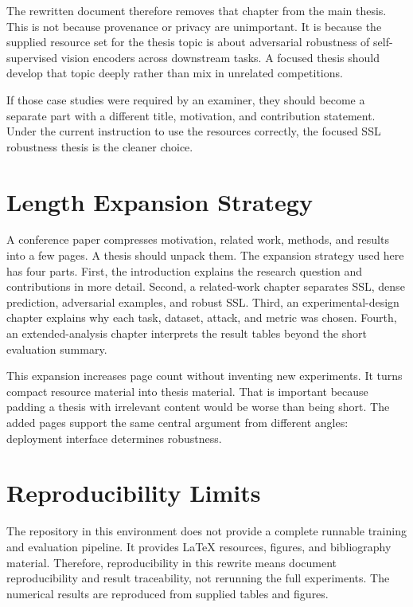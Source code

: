 The rewritten document therefore removes that chapter from the main thesis. This is not because provenance or privacy are unimportant. It is because the supplied resource set for the thesis topic is about adversarial robustness of self-supervised vision encoders across downstream tasks. A focused thesis should develop that topic deeply rather than mix in unrelated competitions.

If those case studies were required by an examiner, they should become a separate part with a different title, motivation, and contribution statement. Under the current instruction to use the resources correctly, the focused SSL robustness thesis is the cleaner choice.

\section{Length Expansion Strategy}

A conference paper compresses motivation, related work, methods, and results into a few pages. A thesis should unpack them. The expansion strategy used here has four parts. First, the introduction explains the research question and contributions in more detail. Second, a related-work chapter separates SSL, dense prediction, adversarial examples, and robust SSL. Third, an experimental-design chapter explains why each task, dataset, attack, and metric was chosen. Fourth, an extended-analysis chapter interprets the result tables beyond the short evaluation summary.

This expansion increases page count without inventing new experiments. It turns compact resource material into thesis material. That is important because padding a thesis with irrelevant content would be worse than being short. The added pages support the same central argument from different angles: deployment interface determines robustness.

\section{Reproducibility Limits}

The repository in this environment does not provide a complete runnable training and evaluation pipeline. It provides LaTeX resources, figures, and bibliography material. Therefore, reproducibility in this rewrite means document reproducibility and result traceability, not rerunning the full experiments. The numerical results are reproduced from supplied tables and figures.

